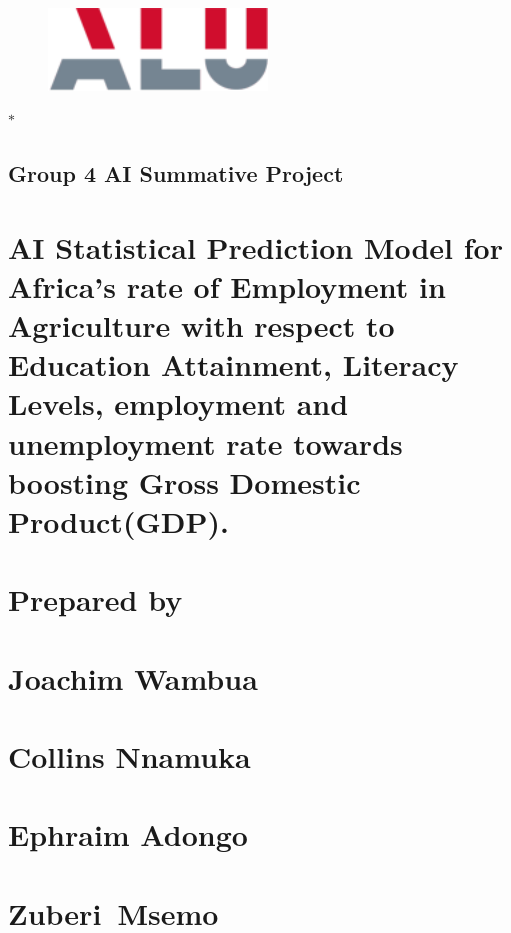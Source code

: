 \documentclass[12pt]{article}
\renewcommand{\_}{\kern-1.5pt\textunderscore\kern-1.5pt}
\begin{document}

\begin{figure}[H]
	\begin{Center}
		\includegraphics[width=2.29in,height=0.87in]{./media/image1.png}
	\end{Center}
\end{figure}



\setlength{\parskip}{12.0pt}
\begin{adjustwidth}{-0.39in}{-0.57in}
\begin{Center}
\sout{\textcolor[HTML]{00796B}{$\ast$ }}
\end{Center}
\end{adjustwidth}

\section*{Group 4 AI Summative Project}
\chapter{AI Statistical Prediction Model for Africa’s rate of Employment in Agriculture with respect to Education Attainment, Literacy Levels, employment and unemployment rate towards boosting Gross Domestic Product(GDP).}
\chapter{Prepared by }
\chapter{Joachim Wambua}
\chapter{Collins Nnamuka}
\chapter{Ephraim Adongo}
\chapter{Zuberi\  Msemo}
\end{document}
